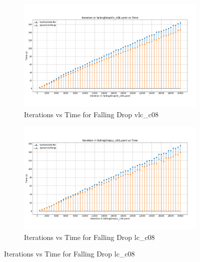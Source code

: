 \section{}
\begin{figure}[H]
\centering
\begin{subfigure}{\linewidth}
    \centering
    \includegraphics[width=\linewidth]{graphs/fallingDrop/normalExperiments/iter/vlcc08.png}
    \caption{Iterations vs Time for Falling Drop vlc\_c08}
    \label{fig:fallingDrop}
\end{subfigure}

\begin{subfigure}{\linewidth}
    \centering
    \includegraphics[width=\linewidth]{graphs/fallingDrop/normalExperiments/iter/lcc08.png}
    \caption{Iterations vs Time for Falling Drop lc\_c08}
    \label{fig:explodingLiquid}
\end{subfigure}

\label{fig:appendixGraphs}
\end{figure}

